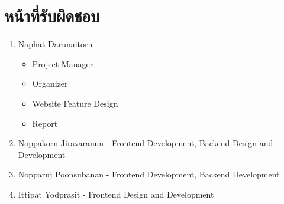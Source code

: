 \documentclass[17pt]{extarticle}
\begin{document}
\pagebreak
\section{หน้าที่รับผิดชอบ}
\begin{enumerate}
    \item Naphat Darunaitorn
          \begin{itemize}
              \item Project Manager
              \item Organizer
              \item Website Feature Design
              \item Report
          \end{itemize}
    \item Noppakorn Jiravaranun - Frontend Development, Backend Design and Development
    \item Nopparuj Poonsubanan - Frontend Development, Backend Development
    \item Ittipat Yodprasit - Frontend Design and Development
\end{enumerate}
\end{document}
